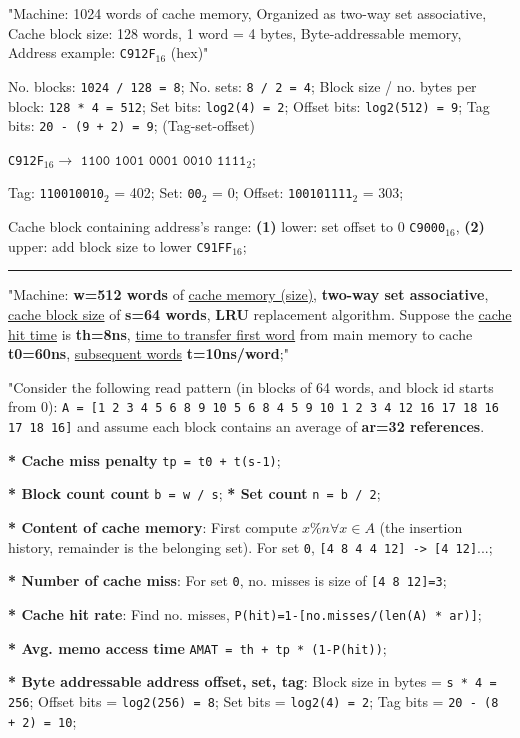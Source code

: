 \documentclass[a4paper]{article}
\begin{document}
\begin{multicols*}{2}
  "Machine: 1024 words of cache memory, Organized as two-way set associative, Cache block size: 128 words, 1 word = 4 bytes, Byte-addressable memory, Address example: \texttt{C912F}$_{16}$ (hex)"

  No. blocks: \texttt{1024 / 128 = 8}; No. sets: \texttt{8 / 2 = 4}; Block size / no. bytes per block: \texttt{128 * 4 = 512};  Set bits: \texttt{log2(4) = 2}; Offset bits: \texttt{log2(512) = 9}; Tag bits: \texttt{20 - (9 + 2) = 9}; (Tag-set-offset)

  \texttt{C912F}$_{16} \to$ $\texttt{1100 1001 0001 0010 1111}_2$;

  Tag: \texttt{110010010}$_2$ = 402; Set: \texttt{00}$_2$ = 0; Offset: \texttt{100101111}$_2$ = 303;

  Cache block containing address's range: \textbf{(1)} lower: set offset to 0 \texttt{C9000}$_{16}$, \textbf{(2)} upper: add block size to lower \texttt{C91FF}$_{16}$;

  \rule{1\linewidth}{0.4pt}

  "Machine: \textbf{w=512 words} of \ul{cache memory (size)}, \textbf{two-way set associative}, \ul{cache block size} of \textbf{s=64 words}, \textbf{LRU} replacement algorithm. Suppose the \ul{cache hit time} is \textbf{th=8ns}, \ul{time to transfer first word} from main memory to cache \textbf{t0=60ns}, \ul{subsequent words} \textbf{t=10ns/word};"

  "Consider the following read pattern (in blocks of 64 words, and block id starts from 0):
  \texttt{A = [1 2 3 4 5 6 8 9 10 5 6 8 4 5 9 10 1 2 3 4 12 16 17 18 16 17 18 16]}
  and assume each block contains an average of \textbf{ar=32 references}.

  \textbf{* Cache miss penalty} \texttt{tp = t0 + t(s-1)};

  \textbf{* Block count count} \texttt{b = w / s};
  \textbf{* Set count} \texttt{n = b / 2};

  \textbf{* Content of cache memory}: First compute $x\%n \forall x \in A$ (the insertion history, remainder is the belonging set). For set \texttt{0}, \texttt{[4 8 4 4 12] -> [4 12]}...;

  \textbf{* Number of cache miss}: For set \texttt{0}, no. misses is size of \texttt{[4 8 12]=3};

  \textbf{* Cache hit rate}: Find no. misses, \texttt{P(hit)=1-[no.misses/(len(A) * ar)]};

  \textbf{* Avg. memo access time} \texttt{AMAT = th + tp * (1-P(hit))};

  \textbf{* Byte addressable address offset, set, tag}: Block size in bytes = \texttt{s * 4 = 256}; Offset bits = \texttt{log2(256) = 8}; Set bits = \texttt{log2(4) = 2}; Tag bits = \texttt{20 - (8 + 2) = 10};


\end{multicols*}
\end{document}
